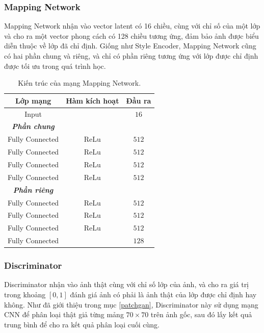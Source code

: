 \documentclass[12pt]{extreport}
\begin{document}
\subsubsection{Mapping Network}

Mapping Network nhận vào vector latent có 16 chiều, cùng với chỉ số của một lớp và cho ra một vector phong cách có 128 chiều tương ứng, đảm bảo ảnh được biểu diễn thuộc về lớp đã chỉ định. Giống như Style Encoder, Mapping Network cũng có hai phần chung và riêng, và chỉ có phần riêng tương ứng với lớp được chỉ định được tối ưu trong quá trình học.

\begin{table}[H]
    \centering
    \begin{tabular}{c c c}
        Lớp mạng        & Hàm kích hoạt & Đầu ra  \\
        \hline
        Input           &               & $ 16 $  \\
        \hline
        \textbf{\textit{Phần chung}}              \\
        Fully Connected & ReLu          & $ 512 $ \\
        Fully Connected & ReLu          & $ 512 $ \\
        Fully Connected & ReLu          & $ 512 $ \\
        Fully Connected & ReLu          & $ 512 $ \\
        \hline
        \textbf{\textit{Phần riêng}}              \\
        Fully Connected & ReLu          & $ 512 $ \\
        Fully Connected & ReLu          & $ 512 $ \\
        Fully Connected & ReLu          & $ 512 $ \\
        Fully Connected &               & $ 128 $
    \end{tabular}
    \caption{Kiến trúc của mạng Mapping Network.}
\end{table}

\subsubsection{Discriminator}

Discriminator nhận vào ảnh thật cùng với chỉ số lớp của ảnh, và cho ra giá trị trong khoảng $ [0, 1] $ đánh giá ảnh có phải là ảnh thật của lớp được chỉ định hay không. Như đã giới thiệu trong mục \ref{patchgan}, Discriminator này sử dụng mạng CNN để phân loại thật giả từng mảng $ 70 \times 70 $ trên ảnh gốc, sau đó lấy kết quả trung bình để cho ra kết quả phân loại cuối cùng.
\end{document}
